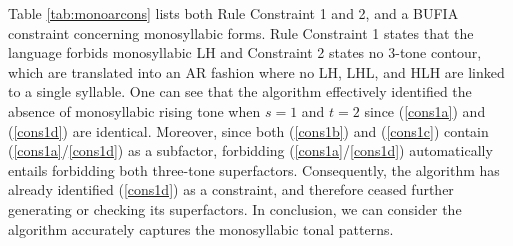 \documentclass[11pt,letterpaper]{article}
\begin{document}
Table \ref{tab:monoarcons} lists both Rule Constraint 1 and 2, and a BUFIA constraint concerning monosyllabic forms. Rule Constraint 1 states that the language forbids monosyllabic LH and Constraint 2 states no 3-tone contour, which are translated into an AR fashion where no LH, LHL, and HLH are linked to a single syllable. One can see that the algorithm effectively identified the absence of monosyllabic rising tone when \( s=1 \) and \( t=2 \) since (\ref{cons1a}) and (\ref{cons1d}) are identical. Moreover, since both (\ref{cons1b}) and (\ref{cons1c}) contain (\ref{cons1a}/\ref{cons1d}) as a subfactor, forbidding (\ref{cons1a}/\ref{cons1d}) automatically entails forbidding both three-tone superfactors. Consequently, the algorithm has already identified (\ref{cons1d}) as a constraint, and therefore ceased further generating or checking its superfactors. In conclusion, we can consider the algorithm accurately captures the monosyllabic tonal patterns.
\end{document}
